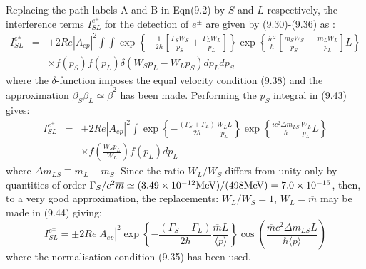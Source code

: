 {    Replacing the path labels A and B in Eqn(9.2) by $S$ and $L$ respectively, the interference terms
    $I_{SL}^{e^{\pm}}$ for the detection of $e^{\pm}$ are given by (9.30)-(9.36) as :
      \begin{eqnarray}
  I_{SL}^{e^{\pm}} & = & \pm 2 Re \left| A_{ep} \right|^2 
   \int \int \exp\left\{-\frac{1}{2 \hbar}\left[\frac{\Gamma_S W_S}{p_S}+\frac{\Gamma_L W_L}{p_L}\right]\right\}
     \exp\left\{\frac{ic^2}{\hbar}\left[\frac{m_S W_S}{p_S}-\frac{m_L W_L}{p_L}\right] L \right\}   \nonumber \\     
     &  & \times  f(p_S)  f(p_L) \delta(W_S p_L-  W_L p_S) dp_L dp_S
     \end{eqnarray}
     where the $\delta$-function imposes the equal velocity condition (9.38) and the approximation 
     $\beta_S \beta_L \simeq  \overline{\beta}^2$ has been made. Performing the $p_S$ integral in
     (9.43) gives:
      \begin{eqnarray}
  I_{SL}^{e^{\pm}} & = & \pm 2 Re \left| A_{ep} \right|^2 
   \int \exp\left\{-\frac{(\Gamma_S+\Gamma_L)}{2 \hbar}\frac{ W_L L}{p_L}\right\}
     \exp\left\{\frac{ic^2 \Delta m_{LS}}{\hbar}\frac{W_L}{p_L}L \right\}   \nonumber \\     
     &  & \times  f(\frac{W_S p_L}{W_L})  f(p_L) dp_L
     \end{eqnarray}
     where $ \Delta m_{LS} \equiv m_L-m_S$. Since the ratio $W_L/W_S$ differs from unity only by
     quantities of order $\Gamma_S/c^2 \overline{m} \simeq (3.49 \times 10^{-12} {\rm MeV})/( 498{\rm MeV})
      = 7.0 \times 10^{-15}$, then, to a very good approximation, the replacements: $W_L/W_S =1$, $W_L = \overline{m}$
     may be made in (9.44) giving:
    \begin{equation}
    I_{SL}^{e^{\pm}} = \pm 2 Re \left| A_{ep} \right|^2 
      \exp\left\{-\frac{(\Gamma_S+\Gamma_L)}{2 \hbar}\frac{ \overline{m} L}{\langle p \rangle}\right\}
    \cos\left(\frac{ \overline{m} c^2 \Delta m_{LS} L}{ \hbar \langle p \rangle}\right)
     \end{equation}
    where the normalisation condition (9.35) has been used. 

}
